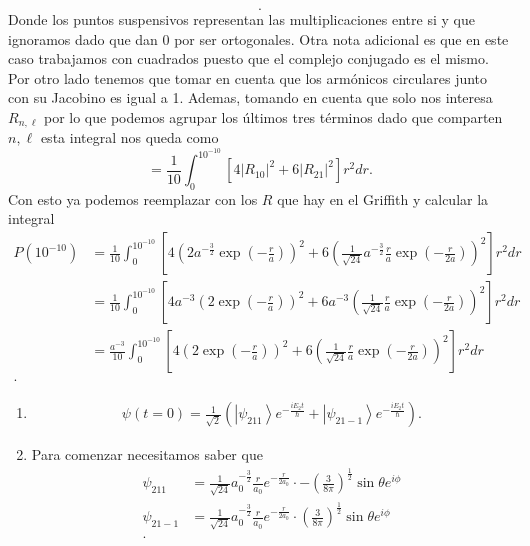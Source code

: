 \documentclass{report}
\begin{document}
\begin{enumerate}
\[.\] Donde los puntos suspensivos representan las multiplicaciones entre si y que ignoramos dado que dan $0$ por ser ortogonales. Otra nota adicional es que en este caso trabajamos con cuadrados puesto que el complejo conjugado es el mismo. Por otro lado tenemos que tomar en cuenta que los armónicos circulares junto con su Jacobino es igual a 1. Ademas, tomando en cuenta que solo nos interesa $R_{n,\ell}$ por lo que podemos agrupar los últimos tres términos dado que comparten $n,\ell$ esta integral nos queda como  \[
= \frac{1}{10}\int_0^{10^{-10}}\left[ 4|R_{10}|^2+6|R_{21}|^2 \right]r^2dr 
.\] Con esto ya podemos reemplazar con los $R$ que hay en el Griffith y calcular la integral
\begin{align*}
	P(10^{-10}) &= \frac{1}{10}\int_0^{10^{-10}}\left[ 4\left( 2a^{-\frac{3}{2}}\exp\left(-\frac{r}{a}\right) \right)^2 + 6\left( \frac{1}{\sqrt{24} }a^{-\frac{3}{2}}\frac{r}{a}\exp\left( -\frac{r}{2a} \right)  \right)^2  \right]r^2 dr\\
		    &= \frac{1}{10}\int_0^{10^{-10}}\left[ 4a^{-3}\left( 2\exp\left(-\frac{r}{a}\right) \right)^2 + 6a^{-3}\left( \frac{1}{\sqrt{24} }\frac{r}{a}\exp\left( -\frac{r}{2a} \right)  \right)^2  \right]r^2 dr\\
		    &= \frac{a^{-3}}{10}\int_0^{10^{-10}}\left[ 4\left( 2\exp\left(-\frac{r}{a}\right) \right)^2 + 6\left( \frac{1}{\sqrt{24} }\frac{r}{a}\exp\left( -\frac{r}{2a} \right)  \right)^2  \right]r^2 dr\\
.\end{align*}
\end{enumerate}


\sol

\begin{enumerate}
	\item 
		\begin{align*}
			\psi(t=0)=\frac{1}{\sqrt{2} }\left( \left|\psi_{211}\right>e^{-\frac{iE_2t}{\hbar}} + \left|\psi_{21-1}\right> e^{-\frac{iE_2t}{\hbar}}\right) 
		.\end{align*}
	\item Para comenzar necesitamos saber que
		\begin{align*}
			\psi_{211} &= \frac{1}{\sqrt{24} }a_0^{-\frac{3}{2}}\frac{r}{a_0}e^{-\frac{r}{2a_0}}\cdot-\left( \frac{3}{8\pi} \right)^{\frac{1}{2}}\sin\theta e^{i\phi} \\
			\psi_{21-1} &= \frac{1}{\sqrt{24} }a_0^{-\frac{3}{2}}\frac{r}{a_0}e^{-\frac{r}{2a_0}}\cdot \left( \frac{3}{8\pi} \right)^{\frac{1}{2}}\sin\theta e^{i\phi} \\ 
		.\end{align*}
\end{enumerate}
\end{document}

